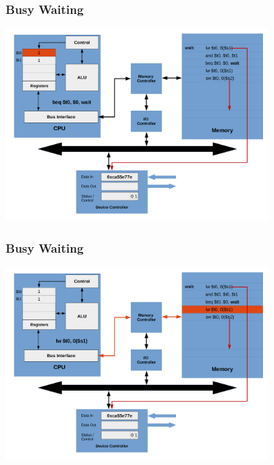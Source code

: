 \documentclass{beamer}
\begin{document}
\begin{frame}%
\frametitle{Busy Waiting}

\vspace*{-0.2cm}
\begin{center}
\hspace*{-1cm}\includegraphics[width=10cm]{busy_waiting17.pdf}
\end{center}

\end{frame}

\begin{frame}%
\frametitle{Busy Waiting}

\vspace*{-0.2cm}
\begin{center}
\hspace*{-1cm}\includegraphics[width=10cm]{busy_waiting18.pdf}
\end{center}

\end{frame}
\end{document}
